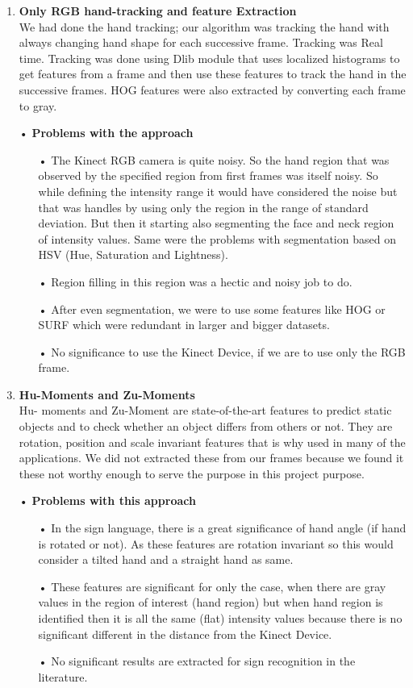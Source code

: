 \begin{enumerate}
\item \textbf{Only RGB hand-tracking and feature Extraction\\}
We had done the hand tracking; our algorithm was tracking the hand with always changing hand shape for each successive frame. Tracking was Real time. Tracking was done using Dlib module that uses localized histograms to get features from a frame and then use these features to track the hand in the successive frames. HOG features were also extracted by converting each frame to gray.
\item[•] \textbf{Problems with the approach}
\begin{enumerate}
\item[•]The Kinect RGB camera is quite noisy. So the hand region that was observed by the specified region from first frames was itself noisy. So while defining the intensity range it would have considered the noise but that was handles by using only the region in the range of standard deviation. But then it starting also segmenting the face and neck region of intensity values. Same were the problems with segmentation based on HSV (Hue, Saturation and Lightness).
\item[•]Region filling in this region was a hectic and noisy job to do.
\item[•]After even segmentation, we were to use some features like HOG or SURF which were redundant in larger and bigger datasets.
\item[•]No significance to use the Kinect Device, if we are to use only the RGB frame.
\end{enumerate}

\item \textbf{Hu-Moments and Zu-Moments \\}
Hu- moments and Zu-Moment are state-of-the-art features to predict static objects and to check whether an object differs from others or not. They are rotation, position and scale invariant features that is why used in many of the applications. We did not extracted these from our frames because we found it these not worthy enough to serve the purpose in this project purpose.
\item[•] \textbf{Problems with this approach}
\begin{enumerate}
\item[•]In the sign language, there is a great significance of hand angle (if hand is rotated or not). As these features are rotation invariant so this would consider a tilted hand and a straight hand as same.
\item[•]These features are significant for only the case, when there are gray values in the region of interest (hand region) but when hand region is identified then it is all the same (flat) intensity values because there is no significant different in the distance from the Kinect Device.
\item[•] No significant results are extracted for sign recognition in the literature.
\end{enumerate}


\end{enumerate}
